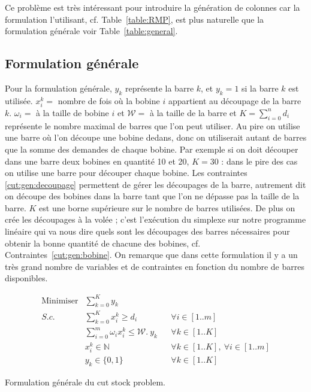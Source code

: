 Ce problème est très intéressant pour introduire la génération de colonnes car la formulation l'utilisant, cf. Table~\ref{table:RMP}, est plus naturelle que la formulation générale voir Table~\ref{table:general}.

\subsection{Formulation générale}

Pour la formulation générale, $y_k$ représente la barre $k$, et $y_k=1$ si la barre $k$ est utilisée. 
$x_{i}^k = $ nombre de fois où la bobine $i$ appartient au découpage de la barre $k$.
$\omega_i = $ à la taille de bobine $i$ et $\mathcal{W} = $ à la taille de la barre et $K = \sum\limits_{i=0}^n d_i$ représente le nombre maximal de barres que l'on peut utiliser. Au pire on utilise une barre où l'on découpe une bobine dedans, donc on utiliserait autant de barres que la somme des demandes de chaque bobine. 
Par exemple si on doit découper dans une barre deux bobines en quantité 10 et 20, $K=30$ : dans le pire des cas on utilise une barre pour découper chaque bobine.
Les contraintes \eqref{cut:gen:decoupage} permettent de gérer les découpages de la barre, autrement dit on découpe des bobines dans la barre tant que l'on ne dépasse pas la taille de la barre.
$K$ est une borne supérieure sur le nombre de barres utilisées.
De plus on crée les découpages à la volée ; c'est l'exécution du simplexe sur notre programme linéaire qui va nous dire quels sont les découpages des barres nécessaires pour obtenir la bonne quantité de chacune des bobines, cf. Contraintes~\eqref{cut:gen:bobine}.
On remarque que dans cette formulation il y a un très grand nombre de variables et de contraintes en fonction du nombre de barres disponibles.


\begin{table}[H]
\begin{align}%
\text{Minimiser} &\sum\limits_{k=0}^K y_k \\ 
S.c. & \sum\limits_{k=0}^K  x_{i}^k \geq  d_i &&\forall i \in [1..m]\label{cut:gen:bobine}\\
& \sum\limits_{i=0}^m \omega_i  x_{i}^k  \leq  \mathcal{W}. ~ y_k   &&\forall k \in [1..K]\label{cut:gen:decoupage}\\
&  x_i^k \in \mathbb{N} && \forall k \in [1..K],~\forall i \in [1..m]\\
&  y_k \in \{0,1\} && \forall k \in [1..K]
\end{align}
\caption{Formulation générale du cut stock problem. \label{table:general}}
\end{table}

